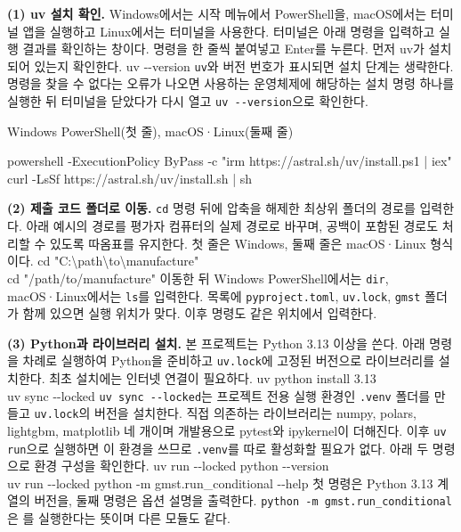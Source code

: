 
\textbf{(1) uv 설치 확인.} Windows에서는 시작 메뉴에서 PowerShell을, macOS에서는 터미널 앱을 실행하고 Linux에서는 터미널을 사용한다. 터미널은 아래 명령을 입력하고 실행 결과를 확인하는 창이다. 명령을 한 줄씩 붙여넣고 Enter를 누른다. 먼저 uv가 설치되어 있는지 확인한다.
\sixopen uv -{}-version\sixclose
\texttt{uv}와 버전 번호가 표시되면 설치 단계는 생략한다. 명령을 찾을 수 없다는 오류가 나오면 사용하는 운영체제에 해당하는 설치 명령 하나를 실행한 뒤 터미널을 닫았다가 다시 열고 \texttt{uv -{}-version}으로 확인한다.
\begin{hwplist}
\item Windows PowerShell(첫 줄), macOS·Linux(둘째 줄)
\end{hwplist}
\sixopen powershell -ExecutionPolicy ByPass -c "irm https://astral.sh/uv/install.ps1 | iex" \\
curl -LsSf https://astral.sh/uv/install.sh | sh\sixclose
{}

\textbf{(2) 제출 코드 폴더로 이동.} \texttt{cd} 명령 뒤에 압축을 해제한 최상위 폴더의 경로를 입력한다. 아래 예시의 경로를 평가자 컴퓨터의 실제 경로로 바꾸며, 공백이 포함된 경로도 처리할 수 있도록 따옴표를 유지한다. 첫 줄은 Windows, 둘째 줄은 macOS·Linux 형식이다.
\sixopen cd "C:\textbackslash{}path\textbackslash{}to\textbackslash{}manufacture" \\
cd "/path/to/manufacture"\sixclose
이동한 뒤 Windows PowerShell에서는 \texttt{dir}, macOS·Linux에서는 \texttt{ls}를 입력한다. 목록에 \texttt{pyproject.toml}, \texttt{uv.lock}, \texttt{gmst} 폴더가 함께 있으면 실행 위치가 맞다. 이후 명령도 같은 위치에서 입력한다.

\textbf{(3) Python과 라이브러리 설치.} 본 프로젝트는 Python 3.13 이상을 쓴다. 아래 명령을 차례로 실행하여 Python을 준비하고 \texttt{uv.lock}에 고정된 버전으로 라이브러리를 설치한다. 최초 설치에는 인터넷 연결이 필요하다.
\sixopen uv python install 3.13 \\
uv sync -{}-locked\sixclose
\texttt{uv sync -{}-locked}는 프로젝트 전용 실행 환경인 \texttt{.venv} 폴더를 만들고 \texttt{uv.lock}의 버전을 설치한다. 직접 의존하는 라이브러리는 numpy, polars, lightgbm, matplotlib 네 개이며 개발용으로 pytest와 ipykernel이 더해진다. 이후 \texttt{uv run}으로 실행하면 이 환경을 쓰므로 \texttt{.venv}를 따로 활성화할 필요가 없다. 아래 두 명령으로 환경 구성을 확인한다.
\sixopen uv run -{}-locked python -{}-version \\
uv run -{}-locked python -m gmst.run\_conditional -{}-help\sixclose
첫 명령은 Python 3.13 계열의 버전을, 둘째 명령은 옵션 설명을 출력한다. \texttt{python -m gmst.run\_conditional}은 를 실행한다는 뜻이며 다른 모듈도 같다.

